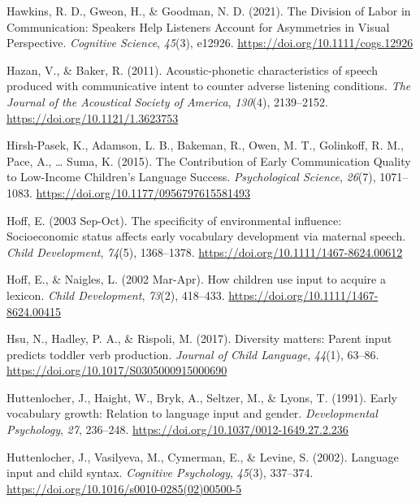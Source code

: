 \documentclass[
  man,floatsintext]{apa6}
\newlength{\cslhangindent}
\newlength{\cslentryspacingunit} %
\newenvironment{CSLReferences}[2] %
 {%
  \setlength{\parindent}{0pt}
  \ifodd #1
  \let\oldpar\par
  \def\par{\hangindent=\cslhangindent\oldpar}
  \fi
  \setlength{\parskip}{#2\cslentryspacingunit}
 }%
 {}
\begin{document}
\begin{CSLReferences}{1}{0}
\leavevmode{}%
Hawkins, R. D., Gweon, H., \& Goodman, N. D. (2021). The {Division} of {Labor} in {Communication}: {Speakers Help Listeners Account} for {Asymmetries} in {Visual Perspective}. \emph{Cognitive Science}, \emph{45}(3), e12926. \url{https://doi.org/10.1111/cogs.12926}

\leavevmode{}%
Hazan, V., \& Baker, R. (2011). Acoustic-phonetic characteristics of speech produced with communicative intent to counter adverse listening conditions. \emph{The Journal of the Acoustical Society of America}, \emph{130}(4), 2139--2152. \url{https://doi.org/10.1121/1.3623753}

\leavevmode{}%
Hirsh-Pasek, K., Adamson, L. B., Bakeman, R., Owen, M. T., Golinkoff, R. M., Pace, A., \ldots{} Suma, K. (2015). The {Contribution} of {Early Communication Quality} to {Low-Income Children}'s {Language Success}. \emph{Psychological Science}, \emph{26}(7), 1071--1083. \url{https://doi.org/10.1177/0956797615581493}

\leavevmode{}%
Hoff, E. (2003 Sep-Oct). The specificity of environmental influence: Socioeconomic status affects early vocabulary development via maternal speech. \emph{Child Development}, \emph{74}(5), 1368--1378. \url{https://doi.org/10.1111/1467-8624.00612}

\leavevmode{}%
Hoff, E., \& Naigles, L. (2002 Mar-Apr). How children use input to acquire a lexicon. \emph{Child Development}, \emph{73}(2), 418--433. \url{https://doi.org/10.1111/1467-8624.00415}

\leavevmode{}%
Hsu, N., Hadley, P. A., \& Rispoli, M. (2017). Diversity matters: Parent input predicts toddler verb production. \emph{Journal of Child Language}, \emph{44}(1), 63--86. \url{https://doi.org/10.1017/S0305000915000690}

\leavevmode{}%
Huttenlocher, J., Haight, W., Bryk, A., Seltzer, M., \& Lyons, T. (1991). Early vocabulary growth: {Relation} to language input and gender. \emph{Developmental Psychology}, \emph{27}, 236--248. \url{https://doi.org/10.1037/0012-1649.27.2.236}

\leavevmode{}%
Huttenlocher, J., Vasilyeva, M., Cymerman, E., \& Levine, S. (2002). Language input and child syntax. \emph{Cognitive Psychology}, \emph{45}(3), 337--374. \url{https://doi.org/10.1016/s0010-0285(02)00500-5}


\end{CSLReferences}
\end{document}
